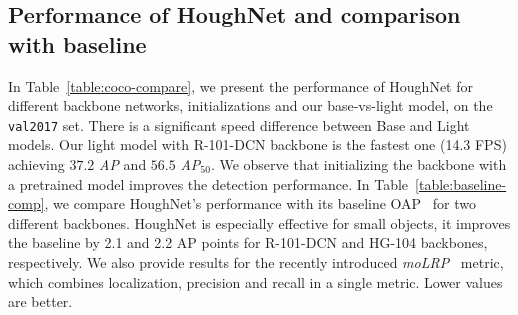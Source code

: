 \documentclass[runningheads]{llncs}
\begin{document}
\subsection{Performance of HoughNet and comparison with baseline}
In Table~\ref{table:coco-compare}, we present the performance of HoughNet for different backbone networks, initializations and  our base-vs-light model, on the \texttt{val2017} set. There is a significant speed difference between Base and Light models. Our light model with R-101-DCN backbone is the fastest one (14.3 FPS) achieving $37.2$ \textit{AP} and $56.5$ \textit{AP$_{50}$}. We observe that initializing the backbone with a pretrained model improves the detection performance.  In Table~\ref{table:baseline-comp}, we compare HoughNet’s performance with its baseline OAP~\cite{centernet} for two different backbones. HoughNet is especially effective for small objects, it improves the baseline by 2.1 and 2.2 AP points for R-101-DCN and HG-104 backbones, respectively. We also provide results for the recently introduced \textit{moLRP}~\cite{lrp} metric, which combines localization, precision and recall in a single metric. Lower values are better. 
\end{document}
